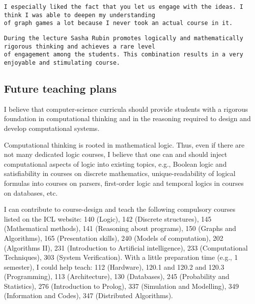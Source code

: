 \documentclass[a4paper,10pt]{scrartcl}
\begin{document}
\begin{verbatim}
I especially liked the fact that you let us engage with the ideas. I think I was able to deepen my understanding 
of graph games a lot because I never took an actual course in it.
\end{verbatim}

\begin{verbatim}
During the lecture Sasha Rubin promotes logically and mathematically rigorous thinking and achieves a rare level 
of engagement among the students. This combination results in a very enjoyable and stimulating course.
\end{verbatim}

\subsection*{Future teaching plans}

I believe that computer-science curricula should provide students with a rigorous foundation in computational thinking and in the reasoning required to design and develop computational systems. 

Computational thinking is rooted in mathematical logic. Thus, even if there are not many dedicated logic courses, I believe that one can and should inject computational aspects of logic into existing topics, e.g., Boolean logic and satisfiability in courses on discrete mathematics, unique-readability of logical formulas into courses on parsers, first-order logic and temporal logics in courses on databases, etc. 


I can contribute to course-design and teach the following compulsory courses listed on the ICL website: 140 (Logic), 142 (Discrete structures), 145 (Mathematical methods), 141 (Reasoning about programs), 150 (Graphs and Algorithms), 165 (Presentation skills), 240 (Models of computation), 202 (Algorithms II), 231 (Introduction to Artificial intelligence), 233 (Computational Techniques), 303 (System Verification). With a little preparation time (e.g., 1 semester), I could help teach: 112 (Hardware), 120.1 and 120.2 and 120.3 (Programming), 113 (Architecture), 130 (Databases), 245 (Probability and Statistics), 276 (Introduction to Prolog), 337 (Simulation and Modelling), 349 (Information and Codes), 347 (Distributed Algorithms). 
\end{document}
